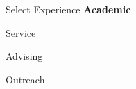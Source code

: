 \documentclass[11pt,letterpaper]{article} %
\begin{document}
%


\begin{rSection}{\textrm{Select Experience}} %
\large{\textbf{Academic}}\\
%
\medskip
%
%
\end{rSection}%
%
%
\begin{rSection}{\textrm{Service}} %
\end{rSection}
\begin{rSection}{\textrm{Advising}} %
\end{rSection}
%
\begin{rSection}{\textrm{Outreach}} %
\end{rSection}
\end{document}
